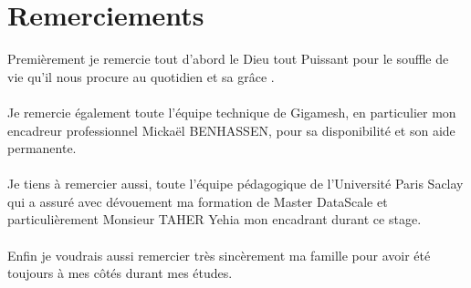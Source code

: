 \documentclass[
11pt, %
french, %
singlespacing, %
headsepline, %
]{MastersDoctoralThesis} %
\begin{document}
\chapter *{Remerciements}
Premièrement je remercie tout d’abord le Dieu tout Puissant pour le souffle de vie qu’il nous procure au quotidien et sa grâce .\\\\Je remercie également toute l'équipe  technique de Gigamesh, en particulier mon encadreur professionnel Mickaël BENHASSEN, pour sa disponibilité et son aide permanente.\\ \\
Je tiens à remercier aussi, toute l’équipe pédagogique de l’Université Paris Saclay qui a assuré avec dévouement ma formation de Master DataScale et particulièrement Monsieur TAHER Yehia mon encadrant durant ce stage.\\ \\Enfin je voudrais aussi remercier très sincèrement ma famille pour avoir été toujours à mes côtés durant mes études.



\end{document}
